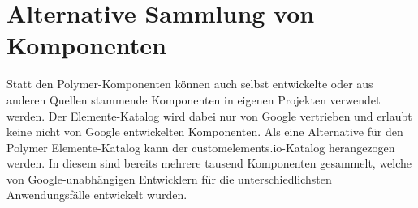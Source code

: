 \section{Alternative Sammlung von Komponenten}\label{alternative-sammlung-von-komponenten}

Statt den Polymer-Komponenten können auch selbst entwickelte oder aus anderen Quellen stammende Komponenten in eigenen Projekten verwendet werden. Der Elemente-Katalog wird dabei nur von Google vertrieben und erlaubt keine nicht von Google entwickelten Komponenten. Als eine Alternative für den Polymer Elemente-Katalog kann der customelements.io-Katalog \cite{citeulike:13926020} herangezogen werden. In diesem sind bereits mehrere tausend Komponenten gesammelt, welche von Google-unabhängigen Entwicklern für die unterschiedlichsten Anwendungsfälle entwickelt wurden.
